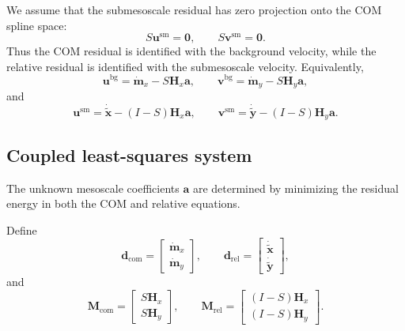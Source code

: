 \documentclass{article}
\begin{document}
We assume that the submesoscale residual has zero projection onto the
COM spline space:
\begin{equation}
S\mathbf{u}^{\mathrm{sm}}=\mathbf{0},
\qquad
S\mathbf{v}^{\mathrm{sm}}=\mathbf{0}.
\end{equation}
Thus the COM residual is identified with the background velocity, while
the relative residual is identified with the submesoscale velocity.
Equivalently,
\begin{equation}
\mathbf{u}^{\mathrm{bg}} = \dot{\mathbf{m}}_x - S\mathbf{H}_x\mathbf{a},
\qquad
\mathbf{v}^{\mathrm{bg}} = \dot{\mathbf{m}}_y - S\mathbf{H}_y\mathbf{a},
\label{eq:bg_residual_def}
\end{equation}
and
\begin{equation}
\mathbf{u}^{\mathrm{sm}} = \dot{\tilde{\mathbf{x}}} - (I-S)\mathbf{H}_x\mathbf{a},
\qquad
\mathbf{v}^{\mathrm{sm}} = \dot{\tilde{\mathbf{y}}} - (I-S)\mathbf{H}_y\mathbf{a}.
\label{eq:sm_residual_def}
\end{equation}

\subsection{Coupled least-squares system}

The unknown mesoscale coefficients \(\mathbf a\) are determined by minimizing
the residual energy in both the COM and relative equations.

Define
\begin{equation}
\mathbf{d}_{\mathrm{com}}
=
\begin{bmatrix}
\dot{\mathbf{m}}_x\\
\dot{\mathbf{m}}_y
\end{bmatrix},
\qquad
\mathbf{d}_{\mathrm{rel}}
=
\begin{bmatrix}
\dot{\tilde{\mathbf{x}}}\\
\dot{\tilde{\mathbf{y}}}
\end{bmatrix},
\end{equation}
and
\begin{equation}
\mathbf{M}_{\mathrm{com}}
=
\begin{bmatrix}
S\mathbf{H}_x\\
S\mathbf{H}_y
\end{bmatrix},
\qquad
\mathbf{M}_{\mathrm{rel}}
=
\begin{bmatrix}
(I-S)\mathbf{H}_x\\
(I-S)\mathbf{H}_y
\end{bmatrix}.
\end{equation}
\end{document}
